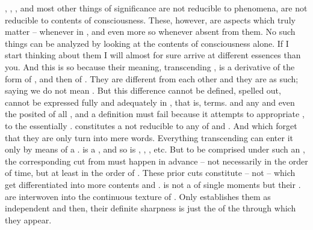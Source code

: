 , , ,  and most other things of
significance are not reducible to phenomena, are not reducible to 
contents of consciousness.  These, however, are aspects which
truly matter -- whenever  in , and even more so whenever
absent from them.
No such things can be analyzed by looking at the  contents of
consciousness alone.  If I start thinking about them I will almost for sure
arrive at different essences than you.  And this is so because their meaning,
transcending , is a derivative of the form of , and
then of .
They are different from each other and they are  as such; saying
 we do not mean .  But this difference cannot be defined,
spelled out, cannot be expressed fully and adequately in , that is,
 terms.  and   any 
and even the posited  of all , and 
a definition must fail because it attempts to appropriate , to
 the 
essentially .  constitutes a  not
reducible to any  of  and . 
 And  which forget that they are only 
turn into mere words.
%
%
Everything transcending  can enter it only by
means of a .  is a , and so is ,
, , etc. But to be comprised under such an , the
corresponding {cut} from  must happen in advance -- not
necessarily in the order of time, but at least in the order of .
These prior {cuts} constitute  -- not  -- which
get differentiated into more  contents and .  is not a  of single moments but their
.   are interwoven into the continuous texture of
. Only  establishes them as independent
 and then, their definite sharpness is just the  of
the  through which they appear.

